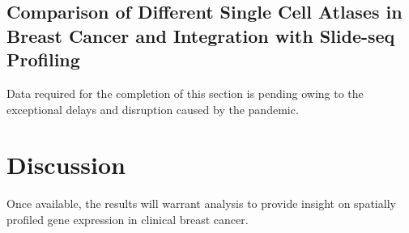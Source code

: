 \subsection{Comparison of Different Single Cell Atlases in Breast Cancer and Integration with Slide-seq Profiling}
Data required for the completion of this section is pending owing to the exceptional delays and disruption caused by the pandemic. 

\section{Discussion}
Once available, the results will warrant analysis to provide insight on spatially profiled gene expression in clinical breast cancer.




